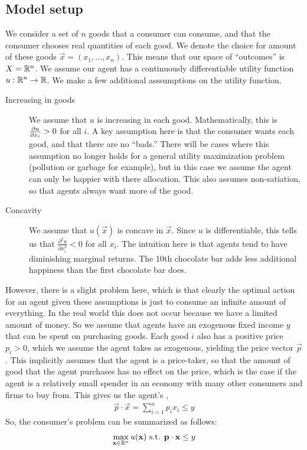 \subsection*{Model setup}
We consider a set of $n$ goods that a consumer can consume, and that the consumer chooses real quantities of each good. We denote the choice for amount of these goods $\vec{x} = (x_1, \dots, x_n)$. This means that our space of ``outcomes'' is $X = \mathbb{R}^n$. We assume our agent has a continuously differentiable utility function $u: \mathbb{R}^n \to \mathbb{R}$. We make a few additional asssumptions on the utility function.
\begin{description}
    \item[Increasing in goods] We assume that $u$ is increasing in each good. Mathematically, this is $\frac{\partial u}{\partial x_i} > 0$ for all $i$. A key assumption here is that the consumer wants each good, and that there are no ``bads.'' There will be cases where this assumption no longer holds for a general utility maximization problem (pollution or garbage for example), but in this case we assume the agent can only be happier with there allocation. This also assumes non-satiation, so that agents always want more of the good. 
    \item[Concavity] We assume that $u(\vec{x})$ is concave in $\vec{x}$. Since $u$ is differentiable, this tells us that $\frac{\partial^2 u}{\partial x_i^2} < 0$ for all $x_i$. The intuition here is that agents tend to have diminishing marginal returns. The 10th chocolate bar adds less additional happiness than the first chocolate bar does.
\end{description}

However, there is a slight problem here, which is that clearly the optimal action for an agent given these assumptions is just to consume an infinite amount of everything. In the real world this does not occur because we have a limited amount of money. So we assume that agents have an exogenous fixed income $y$ that can be spent on purchasing goods. Each good $i$ also has a positive price $p_i > 0$, which we assume the agent takes as exogenous, yielding the price vector $\vec{p}$. This implicitly assumes that the agent is a price-taker, so that the amount of good that the agent purchases has no effect on the price, which is the case if the agent is a relatively small spender in an economy with many other consumers and firms to buy from. This gives us the agent's ,
\begin{align*}
    \vec{p} \cdot \vec{x} = \sum_{i = 1}^n p_i x_i \leq y
\end{align*}
So, the consumer's problem can be summarized as follows:
\begin{align*}
    \max_{\mathbf{x} \in \mathbb{R}^n} u(\mathbf{x}) \text{ s.t. } \mathbf{p} \cdot \mathbf{x} \leq y
\end{align*}

